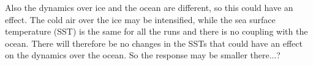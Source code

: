 Also the dynamics over ice and the ocean are different, so this could have an effect. The cold air over the ice may be intensified, while the sea surface temperature (SST) is the same for all the runs and there is no coupling with the ocean. There will therefore be no changes in the SSTs that could have an effect on the dynamics over the ocean. So the response may be smaller there...?







